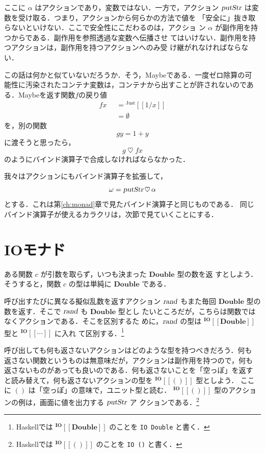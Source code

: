 \documentclass[a5paper,twoside,fleqn,draft]{jsbook}
\def\[{\left[\!\left[}
\def\]{\right]\!\right]}
\newcommand{\programminglanguage}[1]{\textsf{#1}}
\newcommand{\haskell}{\programminglanguage{Haskell}}
\newcommand{\code}[1]{\texttt{#1}}
\newcommand{\mKeyword}[1]{\mathsf{#1}} %
\newcommand{\mOtherwiseKeyword}{\mKeyword{otherwise}}
\DeclareMathOperator{\mOtherwise}{\mOtherwiseKeyword}
\newcommand{\mNothing}{\emptyset}
\newcommand{\mAction}[1]{\textsl{#1}}
\DeclareMathOperator{\mPutStr}{\mAction{putStr}}
\DeclareMathOperator{\mRand}{\mAction{rand}}
\DeclareMathOperator{\mBind}{\heartsuit}
\newcommand{\mType}[1]{\mathbf{#1}}
\newcommand{\mDoubleType}{\mType{Double}}
\newcommand{\mUnitType}{\mType{()}}
\newcommand{\mGenericTypeAssemble}[2]{{}^{\mType{#1}}\[\mType{#2}\]}
\newcommand{\mIOType}[1]{\mGenericTypeAssemble{IO}{#1}}
\newcommand{\mIODoubleType}{\mIOType{\mDoubleType}}
\newcommand{\mIOUnitType}{\mIOType{\mUnitType}}
\newcommand{\mValueConstructor}[1]{\mathrm{#1}}
\newcommand{\mGenericValueAssemble}[2]{{}^\mValueConstructor{#1}\[#2\]}
\newcommand{\mJustWith}[1]{\mGenericValueAssemble{Just}{#1}}
\newcommand{\mGuard}[1]{\mathop{\mid_{#1}}}
\begin{document}
ここに $\alpha$ はアクションであり，変数ではない．一方で，アクション
$\mPutStr$ は変数を受け取る．つまり，アクションから何らかの方法で値を
「安全に」抜き取らないといけない．ここで安全性にこだわるのは，アクショ
ン $\alpha$ が副作用を持つからである．副作用を参照透過な変数へ伝播させ
てはいけない．副作用を持つアクションは，副作用を持つアクションへのみ受
け継がれなければならない．

この話は何かと似ていないだろうか．そう，Maybeである．一度ゼロ除算の可
能性に汚染されたコンテナ変数は，コンテナから出すことが許されないのであ
る．Maybeを返す関数$f$の戻り値
\begin{equation}
  \begin{aligned}
    fx&\mGuard{x\neq0}=\mJustWith{1/x}\\
    &\mGuard{\mOtherwise}=\mNothing
  \end{aligned}
\end{equation}
を，別の関数
\begin{equation}
  gy=1+y
\end{equation}
に渡そうと思ったら，
\begin{equation}
  g\mBind fx
\end{equation}
のようにバインド演算子で合成しなければならなかった．

我々はアクションにもバインド演算子を拡張して，
\begin{equation}
  \omega=\mPutStr\mBind\alpha
\end{equation}
とする．これは第\ref{ch:monad}章で見たバインド演算子と同じものである．
同じバインド演算子が使えるカラクリは，次節で見ていくことにする．

\section{IOモナド}

ある関数 $c$ が引数を取らず，いつも決まった $\mDoubleType$ 型の数を返
すとしよう．そうすると，関数 $c$ の型は単純に $\mDoubleType$ である．

呼び出すたびに異なる擬似乱数を返すアクション $\mRand$ もまた毎回
$\mDoubleType$ 型の数を返す．そこで $\mRand$ も $\mDoubleType$ 型とし
たいところだが，こちらは関数ではなくアクションである．そこを区別するた
めに，$\mRand$ の型は $\mIODoubleType$ 型と $\mIOType{\dotsb}$ に入れ
て区別する．\footnote{\haskell では $\mIODoubleType$ のことを \code{IO
Double} と書く．}

呼び出しても何も返さないアクションはどのような型を持つべきだろう．何も
返さない関数というものは無意味だが，アクションは副作用を持つので，何も
返さないものがあっても良いのである．何も返さないことを「空っぽ」を返す
と読み替えて，何も返さないアクションの型を $\mIOUnitType$ 型としよう．
ここに $\mUnitType$ は「空っぽ」の意味で，ユニット型と読む．
$\mIOUnitType$ 型のアクションの例は，画面に値を出力する $\mPutStr$ ア
クションである．\footnote{\haskell では $\mIOUnitType$ のことを
  \code{IO ()} と書く．}
\end{document}
